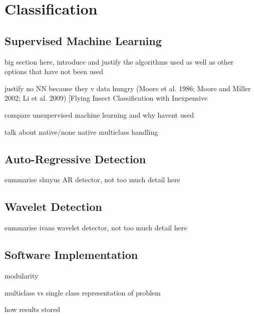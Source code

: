 \section{Classification}
\label{sec:pl-clf}

    \subsection{Supervised Machine Learning}
    \label{subsec:pl-clf-sup}
        \begin{sitemize}
            \item{big section here, introduce and justify the algorithms used as well as other options that have not been used}
            \item{justify no NN because they v data hungry  (Moore et al. 1986; Moore and Miller 2002; Li et al. 2009) [Flying Insect Classification with Inexpensive}
            \item{compare unsupervised machine learning and why havent used}
            \item{talk about native/none native multiclass handling}
        \end{sitemize}
    
    \subsection{Auto-Regressive Detection}
    \label{subsec:pl-clf-ar}
        \begin{sitemize}
            \item{summarise shuyus AR detector, not too much detail here}
        \end{sitemize}
    
    \subsection{Wavelet Detection}
    \label{subsec:pl-clf-wavelet}
        \begin{sitemize}
            \item{summarise ivans wavelet detector, not too much detail here}
        \end{sitemize}

    \subsection{Software Implementation}
    \label{subsec:pl-clf-software}
        \begin{sitemize}
            \item{modularity}
            \item{multiclass vs single class representation of problem}
            \item{how results stored}
        \end{sitemize}